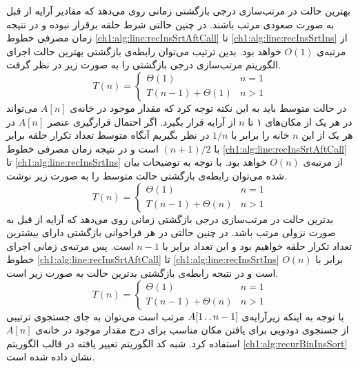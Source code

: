 {بهترین حالت در مرتب‌سازی درجی بازگشتی زمانی روی می‌دهد که مقادیر آرایه‌ از قبل به صورت صعودی مرتب باشند. در چنین حالتی شرط حلقه برقرار نبوده و در نتیجه زمان مصرفی خطوط {\ref{ch1:alg:line:recInsSrtAftCall}} تا {\ref{ch1:alg:line:recInsSrtIns}} از مرتبه‌ی {$O(1)$} خواهد بود. بدین ترتیب می‌توان رابطه‌ی بازگشتی بهترین حالت اجرای الگوریتم مرتب‌سازی درجی بازگشتی را به صورت زیر در نظر گرفت.
\begin{displaymath}
T(n) =
\begin{cases}
\Theta (1) & n=1\\
T(n-1)+\Theta (1) &  n>1
\end{cases}
\end{displaymath}
در حالت متوسط باید به این نکته توجه کرد که مقدار موجود در خانه‌ی {$A[n]$} می‌تواند در هر یک از مکان‌های ۱ تا {$n$}  از آرایه قرار بگیرد. اگر احتمال قرارگیری عنصر {$A[n]$} در هر یک از این {$n$} خانه را برابر با {$1/n$} در نظر بگیریم آنگاه متوسط تعداد تکرار حلقه برابر با {$(n+1)/2$} است و در نتیجه زمان مصرفی خطوط {\ref{ch1:alg:line:recInsSrtAftCall}} تا {\ref{ch1:alg:line:recInsSrtIns}} از مرتبه‌ی {$O(n)$} خواهد بود. با توجه به توضیحات بیان شده می‌توان رابطه‌‌ی بازگشتی حالت متوسط را به صورت زیر نوشت.
\begin{displaymath}
T(n) =
\begin{cases}
\Theta (1) & n=1\\
T(n-1)+\Theta (n) & n>1
\end{cases}
\end{displaymath}
بدترین حالت در مرتب‌سازی درجی بازگشتی زمانی روی می‌دهد که آرایه‌ از قبل به صورت نزولی مرتب باشد. در چنین حالتی در هر فراخوانی بازگشتی دارای بیشترین تعداد تکرار حلقه خواهیم بود و این تعداد برابر با {$n-1$} است. پس مرتبه‌ی زمانی اجرای خطوط {\ref{ch1:alg:line:recInsSrtAftCall}} تا {\ref{ch1:alg:line:recInsSrtIns}} برابر با {$O(n)$} است و در نتیجه رابطه‌ی بازگشتی بدترین حالت به صورت زیر است.
\begin{displaymath}
T(n) =
\begin{cases}
\Theta (1) & n=1\\
T(n-1)+\Theta (n) & n>1
\end{cases}
\end{displaymath}
با توجه به اینکه زیرآرایه‌ی {$A[1\mathinner{\ldotp\ldotp} n-1]$} مرتب است می‌توان به جای جستجوی ترتیبی از جستجوی دودویی برای یافتن مکان مناسب برای درج مقدار موجود در خانه‌ی {$A[n]$} استفاده کرد. شبه کد الگوریتم تغییر یافته در قالب الگوریتم {\eqref{ch1:alg:recurBinInsSort}} نشان داده شده است.

}
